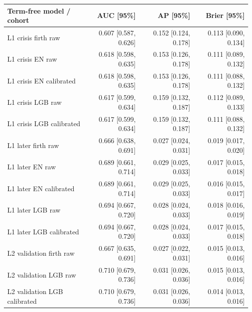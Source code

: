 \begingroup\small\setlength{\tabcolsep}{3pt}
\begin{tabularx}{\linewidth}{Xrrr}\toprule
Term-free model / cohort & AUC [95\%] & AP [95\%] & Brier [95\%] \\ \midrule
L1 crisis firth raw & 0.607 [0.587, 0.626] & 0.152 [0.124, 0.178] & 0.113 [0.090, 0.134] \\
L1 crisis EN raw & 0.618 [0.598, 0.635] & 0.153 [0.126, 0.178] & 0.111 [0.089, 0.132] \\
L1 crisis EN calibrated & 0.618 [0.598, 0.635] & 0.153 [0.126, 0.178] & 0.111 [0.088, 0.132] \\
L1 crisis LGB raw & 0.617 [0.599, 0.634] & 0.159 [0.132, 0.187] & 0.112 [0.089, 0.133] \\
L1 crisis LGB calibrated & 0.617 [0.599, 0.634] & 0.159 [0.132, 0.187] & 0.111 [0.088, 0.132] \\
L1 later firth raw & 0.666 [0.638, 0.691] & 0.027 [0.024, 0.031] & 0.019 [0.017, 0.020] \\
L1 later EN raw & 0.689 [0.661, 0.714] & 0.029 [0.025, 0.033] & 0.017 [0.015, 0.018] \\
L1 later EN calibrated & 0.689 [0.661, 0.714] & 0.029 [0.025, 0.033] & 0.016 [0.015, 0.017] \\
L1 later LGB raw & 0.694 [0.667, 0.720] & 0.028 [0.024, 0.033] & 0.018 [0.016, 0.019] \\
L1 later LGB calibrated & 0.694 [0.667, 0.720] & 0.028 [0.024, 0.033] & 0.017 [0.015, 0.018] \\
L2 validation firth raw & 0.667 [0.635, 0.691] & 0.027 [0.022, 0.031] & 0.015 [0.013, 0.016] \\
L2 validation LGB raw & 0.710 [0.679, 0.736] & 0.031 [0.026, 0.036] & 0.015 [0.013, 0.016] \\
L2 validation LGB calibrated & 0.710 [0.679, 0.736] & 0.031 [0.026, 0.036] & 0.014 [0.013, 0.016] \\
\bottomrule\end{tabularx}\endgroup
